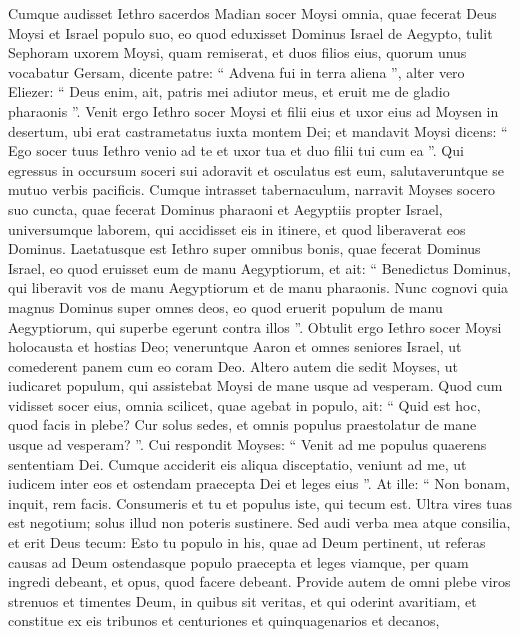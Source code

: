 \begin{biblechapter}
\begin{biblechapter}
\begin{biblechapter}
\begin{biblechapter}
\begin{biblechapter}
\begin{biblechapter}
\begin{biblechapter}
\begin{biblechapter}
\begin{biblechapter}
\begin{biblechapter}
\begin{biblechapter}
\begin{biblechapter}
\begin{biblechapter}
\begin{biblechapter}
\begin{biblechapter}
\begin{biblechapter}
\begin{biblechapter}
\begin{biblechapter}
\verse Cumque audisset Iethro sacerdos Madian socer Moysi omnia, quae fecerat Deus Moysi et Israel populo suo, eo quod eduxisset Dominus Israel de Aegypto, 
 \verse tulit Sephoram uxorem Moysi, quam remiserat, 
\verse et duos filios eius, quorum unus vocabatur Gersam, dicente patre: “ Advena fui in terra aliena ”, 
\verse alter vero Eliezer: “ Deus enim, ait, patris mei adiutor meus, et eruit me de gladio pharaonis ”. 
\verse Venit ergo Iethro socer Moysi et filii eius et uxor eius ad Moysen in desertum, ubi erat castrametatus iuxta montem Dei; 
\verse et mandavit Moysi dicens: “ Ego socer tuus Iethro venio ad te et uxor tua et duo filii tui cum ea ”.
 \verse Qui egressus in occursum soceri sui adoravit et osculatus est eum, salutaveruntque se mutuo verbis pacificis. Cumque intrasset tabernaculum, 
\verse narravit Moyses socero suo cuncta, quae fecerat Dominus pharaoni et Aegyptiis propter Israel, universumque laborem, qui accidisset eis in itinere, et quod liberaverat eos Dominus. 
\verse Laetatusque est Iethro super omnibus bonis, quae fecerat Dominus Israel, eo quod eruisset eum de manu Aegyptiorum, 
\verse et ait: “ Benedictus Dominus, qui liberavit vos de manu Aegyptiorum et de manu pharaonis. 
\verse Nunc cognovi quia magnus Dominus super omnes deos, eo quod eruerit populum de manu Aegyptiorum, qui superbe egerunt contra illos ”. 
\verse Obtulit ergo Iethro socer Moysi holocausta et hostias Deo; veneruntque Aaron et omnes seniores Israel, ut comederent panem cum eo coram Deo.
 \verse Altero autem die sedit Moyses, ut iudicaret populum, qui assistebat Moysi de mane usque ad vesperam. 
\verse Quod cum vidisset socer eius, omnia scilicet, quae agebat in populo, ait: “ Quid est hoc, quod facis in plebe? Cur solus sedes, et omnis populus praestolatur de mane usque ad vesperam? ”. 
\verse Cui respondit Moyses: “ Venit ad me populus quaerens sententiam Dei. 
\verse Cumque acciderit eis aliqua disceptatio, veniunt ad me, ut iudicem inter eos et ostendam praecepta Dei et leges eius ”. 
\verse At ille: “ Non bonam, inquit, rem facis. 
\verse Consumeris et tu et populus iste, qui tecum est. Ultra vires tuas est negotium; solus illud non poteris sustinere. 
\verse Sed audi verba mea atque consilia, et erit Deus tecum: Esto tu populo in his, quae ad Deum pertinent, ut referas causas ad Deum 
\verse ostendasque populo praecepta et leges viamque, per quam ingredi debeant, et opus, quod facere debeant. 
\verse Provide autem de omni plebe viros strenuos et timentes Deum, in quibus sit veritas, et qui oderint avaritiam, et constitue ex eis tribunos et centuriones et quinquagenarios et decanos, 

\end{biblechapter}
\end{biblechapter}
\end{biblechapter}
\end{biblechapter}
\end{biblechapter}
\end{biblechapter}
\end{biblechapter}
\end{biblechapter}
\end{biblechapter}
\end{biblechapter}
\end{biblechapter}
\end{biblechapter}
\end{biblechapter}
\end{biblechapter}
\end{biblechapter}
\end{biblechapter}
\end{biblechapter}
\end{biblechapter}
